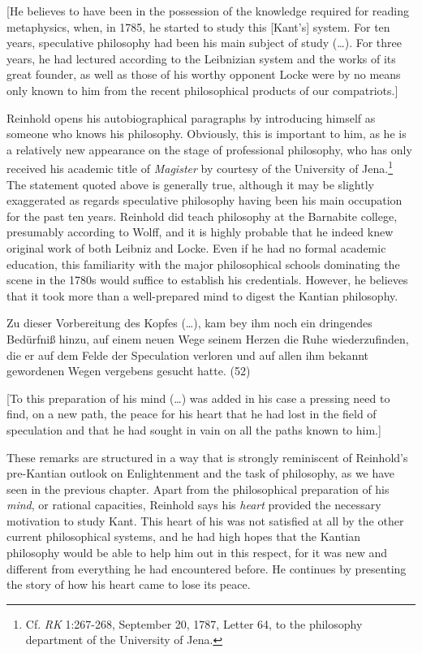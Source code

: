 [He believes to have been in the possession of the knowledge required for reading metaphysics, when, in 1785, he started to study this [Kant's] system. For ten years, speculative philosophy had been his main subject of study (\ldots ). For three years, he had lectured according to the Leibnizian system and the works of its great founder, as well as those of his worthy opponent Locke were by no means only known to him from the recent philosophical products of our compatriots.] 

Reinhold opens his autobiographical paragraphs by introducing himself as someone who knows his philosophy. Obviously, this is important to him, as he is a relatively new appearance on the stage of professional philosophy, who has only received his academic title of \textit{Magister} by courtesy of the University of Jena.\footnote{ Cf. \textit{RK} 1:267{-}268, September 20, 1787, Letter 64, to the philosophy department of the University of Jena.} The statement quoted above is generally true, although it may be slightly exaggerated as regards speculative philosophy having been his main occupation for the past ten years. Reinhold did teach philosophy at the Barnabite college, presumably according to Wolff, and it is highly probable that he indeed knew original work of both Leibniz and Locke. Even if he had no formal academic education, this familiarity with the major philosophical schools dominating the scene in the 1780s would suffice to establish his credentials. However, he believes that it took more than a well{-}prepared mind to digest the Kantian philosophy. 

Zu dieser Vorbereitung des Kopfes (\ldots ), kam bey ihm noch ein dringendes Bed\"{u}rfni\ss{} hinzu, auf einem neuen Wege seinem Herzen die Ruhe wiederzufinden, die er auf dem Felde der Speculation verloren und auf allen ihm bekannt gewordenen Wegen vergebens gesucht hatte. (52)

[To this preparation of his mind (\ldots ) was added in his case a pressing need to find, on a new path, the peace for his heart that he had lost in the field of speculation and that he had sought in vain on all the paths known to him.] 

These remarks are structured in a way that is strongly reminiscent of Reinhold's pre{-}Kantian outlook on Enlightenment and the task of philosophy, as we have seen in the previous chapter. Apart from the philosophical preparation of his \textit{mind}, or rational capacities, Reinhold says his \textit{heart} provided the necessary motivation to study Kant. This heart of his was not satisfied at all by the other current philosophical systems, and he had high hopes that the Kantian philosophy would be able to help him out in this respect, for it was new and different from everything he had encountered before. He continues by presenting the story of how his heart came to lose its peace. 

